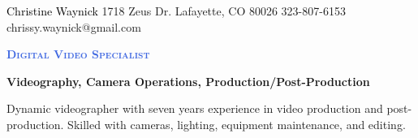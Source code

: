 \documentclass[letterpaper, 11pt]{article}
\newcommand{\NrcColorName}{Black}
\newcommand{\NrcColorTitle}{RoyalBlue}
\begin{document}
%
\nrctitle
{\textcolor{\NrcColorName}{Christine Waynick}}
{1718 Zeus Dr.}
{Lafayette, CO 80026}
{323-807-6153}
{chrissy.waynick@gmail.com}
%
\begin{center}\par\smallskip
\textcolor{\NrcColorTitle}{\Large \textbf{\textsc{Digital Video Specialist}}}\par
\large \textbf{{Videography, Camera Operations, Production/Post-Production}}\par
\smallskip
\noindent \begin{minipage}[t]{0.75\textwidth}%
\begin{sloppypar}
Dynamic videographer with seven years experience in video production and
post-production. Skilled with cameras, lighting, equipment maintenance, and editing.
\end{sloppypar}
\end{minipage}
\end{center}
\par \smallskip \smallskip
%
%
\end{document}
